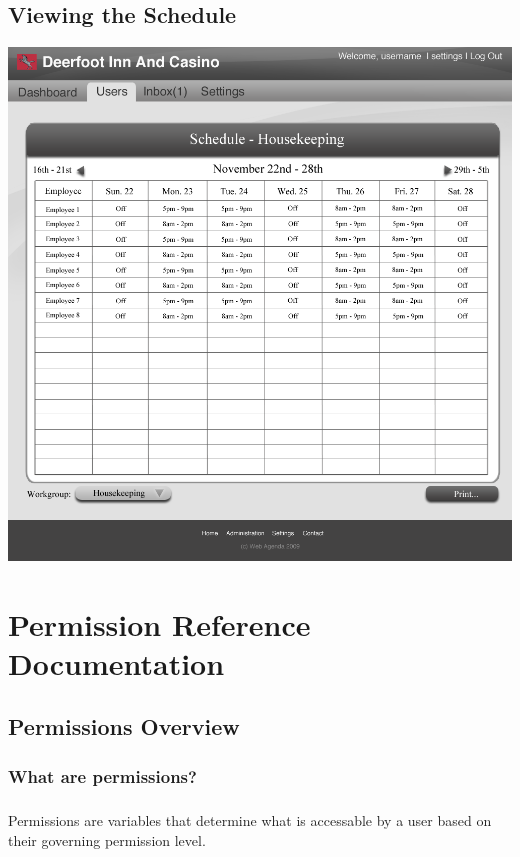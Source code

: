\documentclass[letterpaper,12pt]{report}
\begin{document}
\begin{landscape}
\section{Viewing the Schedule}
\begin{center}
 \includegraphics[scale=0.3]{prototypes/workgroup_schedule.png}
\end{center}

\end{landscape}

\chapter{Permission Reference Documentation}

\section{Permissions Overview}

\subsection*{What are permissions?}
	\paragraph*{}\hspace{0.6cm}Permissions are variables that determine what is accessable by a user based on their governing permission level.
\end{document}
